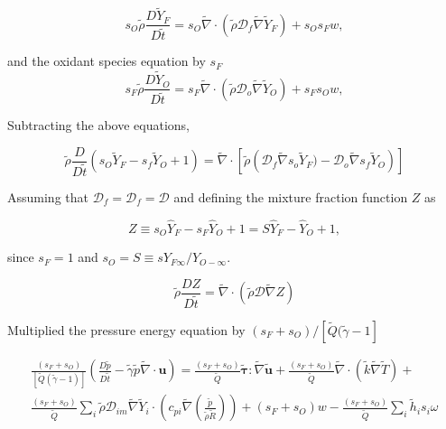 \documentclass[preprint,12pt,authoryear]{elsarticle}
\begin{document}
\begin{equation}
	s_O
	\tilde{\rho} \frac{D  \tilde{Y}_F }{D \tilde{t}}
= 
	s_O
	\tilde{\nabla}\cdot( \tilde{\rho} \mathcal{D}_f\tilde{\nabla} \tilde{Y}_F)
	+
	s_O
        s_F w,
\label{eqYF}
\end{equation}


and the oxidant species equation by $s_F$ 
\begin{equation}
	s_F
	\tilde{\rho} \frac{D  \tilde{Y}_O }{D \tilde{t}}
= 
	s_F
	\tilde{\nabla}\cdot( \tilde{\rho} \mathcal{D}_o\tilde{\nabla} 
	\tilde{Y}_O
	)
	+
	s_F
    	s_O 
	w,
\label{eqYO}
\end{equation}


Subtracting  the above equations,

\begin{equation}
	\tilde{\rho} \frac{D  }{D \tilde{t}} 
	(s_O \tilde{Y}_F - s_f \tilde{Y}_O + 1) 
= 
	\tilde{\nabla}
	\cdot
	\left[
		\tilde{\rho} 
		\left( 
			\mathcal{D}_f\tilde{\nabla} s_o \tilde{Y}_F)
			-
		    \mathcal{D}_o\tilde{\nabla} {s_f \tilde{Y}_O}
		\right) 
	\right] 
\end{equation}

Assuming that $\mathcal{D}_f=\mathcal{D}_f=\mathcal{D}$ and 
defining the mixture fraction function $Z$ as 

\begin{equation}
Z 
\equiv 
s_O\hat{Y}_F 
- 
s_F \hat{Y}_O 
+ 1 
= 
S\hat{Y}_F 
- 
\hat{Y}_O 
+ 
1,
\end{equation}

since $s_F=1$ and $s_O= S \equiv s Y_{F\infty}/Y_{O-\infty}$.
%

\begin{equation}
	\tilde{\rho} \frac{D Z }{D \tilde{t}}
= 
	\tilde{\nabla}
	\cdot
	\left(
		\tilde{\rho} \mathcal{D} \tilde{\nabla} Z 
	\right)  
\end{equation}

Multiplied the pressure energy equation by 
$(s_F+s_O)/[\tilde{Q}(\tilde{\gamma}-1]$

\begin{equation}
\begin{split}
	\frac{(s_F+s_O)}{[\tilde{Q}(\tilde{\gamma}-1)]}
	\left(
        	\frac{D \tilde{p}}{D\tilde{t}}
		-
		\tilde{\gamma}
		\tilde{p} 
		\tilde{\nabla}\cdot{\mathbf{u}}
	\right)
        =
	\frac{(s_F+s_O)}{\tilde{Q}}
        \pmb{\tilde{\tau}}:\tilde{\nabla} \tilde{\mathbf{u}} 
        + 
	\frac{(s_F+s_O)}{\tilde{Q}}
        \tilde{\nabla} \cdot (\tilde{k}\tilde{\nabla} \tilde{T})
        +
	\\
	\frac{(s_F+s_O)}{\tilde{Q}}
        \sum\limits_i 
        \tilde{\rho}
        \mathcal{D}_{im}
        \tilde{\nabla}
        \tilde{Y}_i     
        \cdot
        \left(
                c_{pi}
                \tilde{\nabla}
                \left(
                	\frac{\tilde{p}}{\tilde{\rho}\tilde{R}}
                \right)
        \right)
	+
	(s_F+s_O)w
	-
	\frac{(s_F+s_O)}{\tilde{Q}}
        \sum\limits_i
	\tilde{h}_i
        s_i \omega	
\end{split}
\end{equation}
\end{document}
